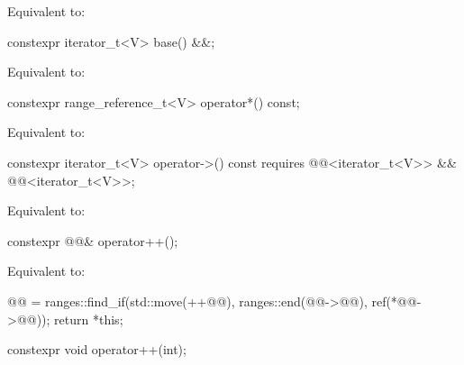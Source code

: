 \begin{itemdescr}
\pnum
\effects
Equivalent to: 
\end{itemdescr}

%
\begin{itemdecl}
constexpr iterator_t<V> base() &&;
\end{itemdecl}

\begin{itemdescr}
\pnum
\effects
Equivalent to: 
\end{itemdescr}

%
\begin{itemdecl}
constexpr range_reference_t<V> operator*() const;
\end{itemdecl}

\begin{itemdescr}
\pnum
\effects
Equivalent to: 
\end{itemdescr}

%
\begin{itemdecl}
constexpr iterator_t<V> operator->() const
  requires @@<iterator_t<V>> && @@<iterator_t<V>>;
\end{itemdecl}

\begin{itemdescr}
\pnum
\effects
Equivalent to: 
\end{itemdescr}

%
\begin{itemdecl}
constexpr @@& operator++();
\end{itemdecl}

\begin{itemdescr}
\pnum
\effects
Equivalent to:
\begin{codeblock}
@@ = ranges::find_if(std::move(++@@), ranges::end(@@->@@),
                           ref(*@@->@@));
return *this;
\end{codeblock}
\end{itemdescr}

%
\begin{itemdecl}
constexpr void operator++(int);
\end{itemdecl}


